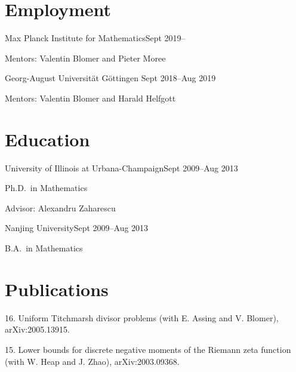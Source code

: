 \documentclass[margin,line,pifont,palatino,courier]{res}
\newenvironment{list1}{
  \begin{list}{\ding{113}}{%
      \setlength{\itemsep}{0in}
      \setlength{\parsep}{0in} \setlength{\parskip}{0in}
      \setlength{\topsep}{0in} \setlength{\partopsep}{0in}
      \setlength{\leftmargin}{0.17in}}}{\end{list}}
\begin{document}
\begin{resume}
\section{\sc Employment} 
{Max Planck Institute for Mathematics}\hfill{Sept 2019--}

\begin{list1}

		\item[] Mentors: Valentin Blomer and Pieter Moree

\end{list1}
{Georg-August Universit\"at G\"ottingen} \hfill{Sept 2018--Aug 2019}

\begin{list1}

		\item[] Mentors: Valentin Blomer and Harald Helfgott


\end{list1}
\section{\sc Education}

{ University of Illinois at Urbana-Champaign}\hfill{Sept 2009--Aug 2013}\\
\vspace*{-.1in}
\begin{list1}
\item[] Ph.D.~in Mathematics
\item[] Advisor: Alexandru Zaharescu

\end{list1}

{ Nanjing University}\hfill{Sept 2009--Aug 2013}\\
\vspace*{-.1in}
\begin{list1}
\item[] B.A.~in Mathematics

\end{list1}






\section{\sc Publications}
16. {Uniform Titchmarsh divisor problems} (with E. Assing and V. Blomer), arXiv:2005.13915. 

15. {Lower bounds for discrete negative moments of the Riemann zeta function (with W. Heap and J. Zhao)}, arXiv:2003.09368.


\end{resume}
\end{document}
